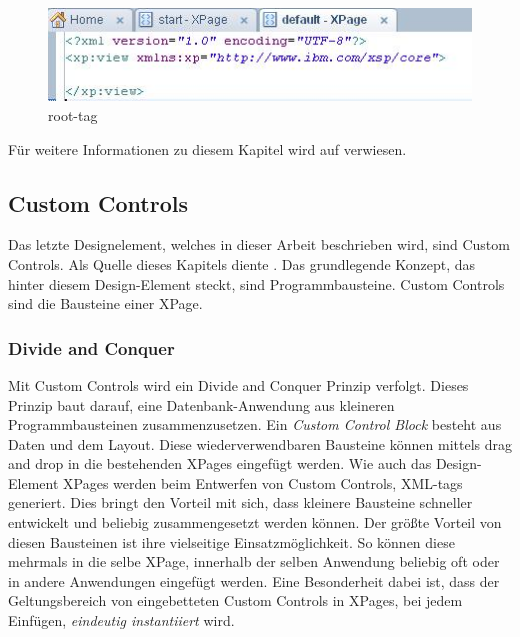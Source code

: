 \begin{figure}[H]
    \centerline{\includegraphics[scale=0.7]{pics/root-tag}}
    \caption[Root Element einer XPage]{\label{FiG:root-tag }
	root-tag}
\end{figure}


Für weitere Informationen zu diesem Kapitel wird auf \cite{donelly} verwiesen. 

 
\subsection{Custom Controls}
\label{sec:4designelemente} 
 
Das letzte Designelement, welches in dieser Arbeit beschrieben wird, sind Custom Controls. Als Quelle dieses Kapitels diente \cite{donelly}.
Das grundlegende Konzept, das hinter diesem Design-Element steckt, sind Programmbausteine. Custom Controls sind die Bausteine einer XPage.

\subsubsection{Divide and Conquer} 
\label{sec:4designelemente} 
Mit Custom Controls wird ein Divide and Conquer Prinzip verfolgt. Dieses Prinzip baut \linebreak darauf, eine Datenbank-Anwendung aus kleineren
 Programmbausteinen zusammenzusetzen. Ein \textit{Custom Control Block} besteht aus Daten und dem Layout.
Diese wiederverwendbaren Bausteine können mittels drag and drop in die bestehenden XPages eingefügt werden. Wie auch das Design-Element XPages
werden beim Entwerfen von Custom Controls, XML-tags generiert.
Dies bringt den Vorteil mit sich, dass kleinere Bausteine schneller entwickelt und beliebig zusammengesetzt werden können. 
Der größte Vorteil von diesen Bausteinen ist \linebreak ihre vielseitige Einsatzmöglichkeit. So können diese mehrmals in die selbe XPage, innerhalb 
der \linebreak selben
Anwendung beliebig oft oder in andere Anwendungen eingefügt werden. 
Eine \linebreak Besonderheit dabei ist, dass der Geltungsbereich von eingebetteten Custom Controls in \linebreak XPages, bei jedem Einfügen, 
\textit{eindeutig instantiiert}
 wird.
\newline



